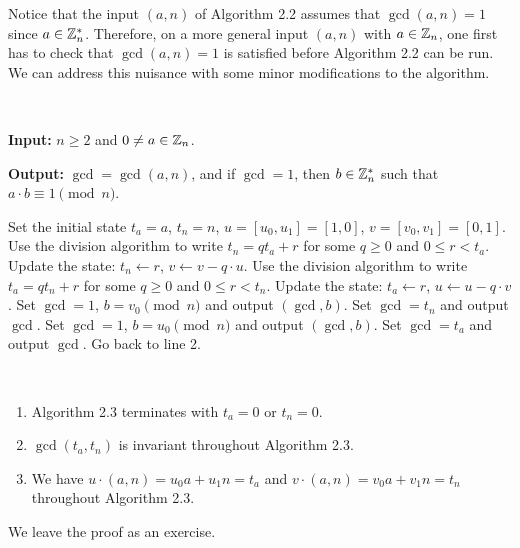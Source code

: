Notice that the input $(a, n)$ of Algorithm 2.2 assumes that $\gcd(a, n) = 1$ since $a \in \mathbb{Z}_n^*$. 
Therefore, on a more general input $(a, n)$ with $a \in \mathbb{Z}_n$, one first has to check that 
$\gcd(a, n) = 1$ is satisfied before Algorithm 2.2 can be run. We can address this nuisance with 
some minor modifications to the algorithm.

\begin{algo}~

{\bf Input:} $n \geq 2$ and $0 \neq a \in \mathbb{Z}_n$.

{\bf Output:} $\gcd = \gcd(a, n)$, and if $\gcd = 1$, then $b \in \mathbb{Z}_n^*$ such that $a \cdot b \equiv 1 \pmod n$. \vspace{0.5em}

\begin{algorithmic}[1]
\State Set the initial state $t_a = a$, $t_n = n$, $u = [u_0, u_1] = [1, 0]$, $v = [v_0, v_1] = [0, 1]$. 
    \State Use the division algorithm to write $t_n = qt_a + r$ for some $q \geq 0$ and $0 \leq r < t_a$.
    \State Update the state: $t_n \gets r$, $v \gets v - q \cdot u$. 
    \State Use the division algorithm to write $t_a = qt_n + r$ for some $q \geq 0$ and $0 \leq r < t_n$.
    \State Update the state: $t_a \gets r$, $u \gets u - q \cdot v$. 
\EndIf 
{}
        \State Set $\gcd = 1$, $b = v_0 \pmod n$ and output $(\gcd, b)$.
    \Else
        \State Set $\gcd = t_n$ and output $\gcd$. 
    \EndIf
{}
        \State Set $\gcd = 1$, $b = u_0 \pmod n$ and output $(\gcd, b)$.
    \Else
        \State Set $\gcd = t_a$ and output $\gcd$. 
    \EndIf
\Else
    \State Go back to line 2.
\EndIf
\end{algorithmic}
\end{algo}

\newpage
\begin{lemma}~
\begin{enumerate}[(1)]
    \item Algorithm 2.3 terminates with $t_a = 0$ or $t_n = 0$. 
    \item $\gcd(t_a, t_n)$ is invariant throughout Algorithm 2.3.
    \item We have $u \cdot (a, n) = u_0a + u_1n = t_a$ and $v \cdot (a, n) = v_0a + v_1n = t_n$
    throughout Algorithm 2.3. 
\end{enumerate}
\end{lemma}
\begin{pf}
We leave the proof as an exercise. 
\end{pf}

